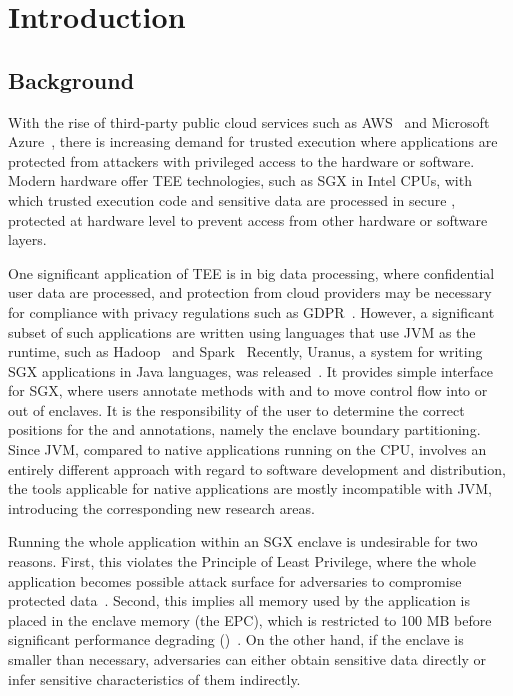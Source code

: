\section{Introduction}\label{sec:introduction}

\subsection{Background}\label{subsec:background}
With the rise of third-party public cloud services
such as \ac{AWS}~\cite{aws} and Microsoft Azure~\cite{azure},
there is increasing demand for trusted execution where
applications are protected from
attackers with privileged access to the hardware or software.
Modern hardware offer \ac{TEE} technologies,
such as \ac{SGX} in Intel CPUs,
with which trusted execution code and sensitive data
are processed in secure ,
protected at hardware level to prevent access
from other hardware or software layers.

One significant application of \ac{TEE} is in big data processing,
where confidential user data are processed,
and protection from cloud providers may be necessary
for compliance with privacy regulations such as GDPR~\cite{gdpr}.
However, a significant subset of such applications are written
using languages that use \ac{JVM} as the runtime,
such as Hadoop~\cite{apachehadoop} and Spark~\cite{apachespark}
Recently, Uranus, a system for
writing \ac{SGX} applications in Java languages, was released~\cite{uranus}.
It provides simple interface for \ac{SGX},
where users annotate methods with  and 
to move control flow into or out of enclaves.
It is the responsibility of the user to determine the correct positions
for the  and  annotations,
namely the enclave boundary partitioning.
Since \ac{JVM}, compared to native applications running on the CPU,
involves an entirely different approach
with regard to software development and distribution,
the tools applicable for native applications are mostly incompatible with \ac{JVM},
introducing the corresponding new research areas.

Running the whole application within an \ac{SGX} enclave is undesirable for two reasons.
First, this violates the Principle of Least Privilege,
where the whole application becomes possible attack surface
for adversaries to compromise protected data~\cite{glamdring}.
Second, this implies all memory used by the application
is placed in the enclave memory (the \ac{EPC}),
which is restricted to 100 MB before significant performance degrading
()~\cite{uranus}.
On the other hand, if the enclave is smaller than necessary,
adversaries can either obtain sensitive data directly or
infer sensitive characteristics of them indirectly.

